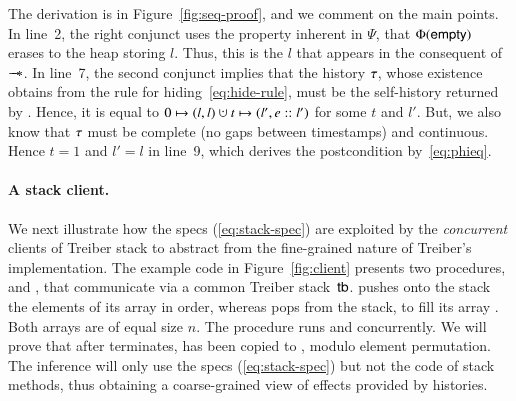 The derivation is in Figure~\ref{fig:seq-proof}, and we comment on the
main points. In line~2, the right conjunct uses the property inherent
in $\Psi$, that $\Phi(\mathsf{empty})$ erases to the heap storing $l$. Thus,
this is the $l$ that appears in the consequent of $\mathop{-\!\!\!\!-\!\!\!\ast}$. In line~7,
the second conjunct implies that the history $\tau$, whose existence
obtains from the rule for hiding~\eqref{eq:hide-rule}, must be the
self-history returned by . Hence, it is equal to $0 \hpts
(l, l) \hunion t \hpts (l', e::l')$ for some $t$ and $l'$. But, we
also know that $\tau$ must be complete (no gaps between timestamps)
and continuous. Hence $t = 1$ and $l' = l$ in line~9, which derives
the postcondition by~\eqref{eq:phieq}.

\paragraph{A stack client.}
%
We next illustrate how the specs (\ref{eq:stack-spec}) are exploited
by the \emph{concurrent} clients of Treiber stack to abstract from the
fine-grained nature of Treiber's implementation.
%
%
The example code in Figure~\ref{fig:client} presents two procedures,
 and , that communicate via a common
Treiber stack~$\mathsf{tb}$.  pushes onto the stack the
elements of its array  in order, whereas  pops
from the stack, to fill its array . Both arrays are of equal
size $n$. The procedure  runs  and
 concurrently. We will prove that after 
terminates,  has been copied to , modulo element
permutation. The inference will only use the specs
(\ref{eq:stack-spec}) but not the code of stack methods, thus
obtaining a coarse-grained view of effects provided by histories.

